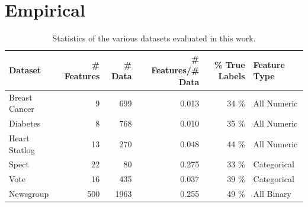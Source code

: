 \section{Empirical}

\begin{table}[tbp!]
\centering
\begin{tabular}{|l|r|r|r|r|l|} \hline
Dataset & \# Features & \# Data & \# Features/\# Data & \% True Labels & Feature Type\\ \hline \hline 
Breast Cancer	& 9	& 699	& 0.013	& 34 \%	& All Numeric\\ \hline
Diabetes        & 8	& 768	& 0.010	& 35 \%	& All Numeric\\ \hline
Heart Statlog	& 13	& 270	& 0.048	& 44 \%	& All Numeric\\ \hline
Spect	        & 22	& 80	& 0.275 & 33 \%	& Categorical\\ \hline
Vote	        & 16	& 435	& 0.037	& 39 \%	& Categorical\\ \hline
Newsgroup	& 500	& 1963	& 0.255	& 49 \%	& All Binary\\ \hline
\end{tabular}
\caption{\footnotesize Statistics of the various datasets evaluated in this work.}
\label{table:stats}
\end{table}

